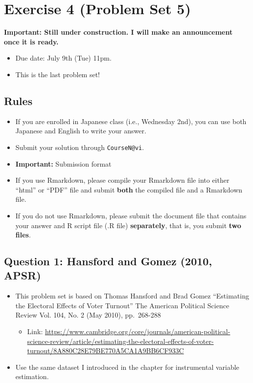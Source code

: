 \documentclass[]{book}
\providecommand{\tightlist}{%
  \setlength{\itemsep}{0pt}\setlength{\parskip}{0pt}}
\begin{document}
\chapter{Exercise 4 (Problem Set 5)}\label{exercise-4-problem-set-5}

\textbf{Important: Still under construction. I will make an announcement
once it is ready.}

\begin{itemize}
\tightlist
\item
  Due date: July 9th (Tue) 11pm.
\item
  This is the last problem set!
\end{itemize}

\section{Rules}\label{rules-2}

\begin{itemize}
\tightlist
\item
  If you are enrolled in Japanese class (i.e., Wednesday 2nd), you can
  use both Japanese and English to write your answer.
\item
  Submit your solution through \texttt{CourseN@vi}.
\item
  \textbf{Important:} Submission format
\item
  If you use Rmarkdown, please compile your Rmarkdown file into either
  ``html'' or ``PDF'' file and submit \textbf{both} the compiled file
  and a Rmarkdown file.
\item
  If you do not use Rmarkdown, please submit the document file that
  contains your answer and R script file (.R file) \textbf{separately},
  that is, you submit \textbf{two files}.
\end{itemize}

\section{Question 1: Hansford and Gomez (2010,
APSR)}\label{question-1-hansford-and-gomez-2010-apsr}

\begin{itemize}
\tightlist
\item
  This problem set is based on Thomas Hansford and Brad Gomez
  ``Estimating the Electoral Effects of Voter Turnout'' The American
  Political Science Review Vol. 104, No. 2 (May 2010), pp.~268-288

  \begin{itemize}
  \tightlist
  \item
    Link:
    \url{https://www.cambridge.org/core/journals/american-political-science-review/article/estimating-the-electoral-effects-of-voter-turnout/8A880C28E79BE770A5CA1A9BB6CF933C}
  \end{itemize}
\item
  Use the same dataset I introduced in the chapter for instrumental
  variable estimation.
\end{itemize}
\end{document}
